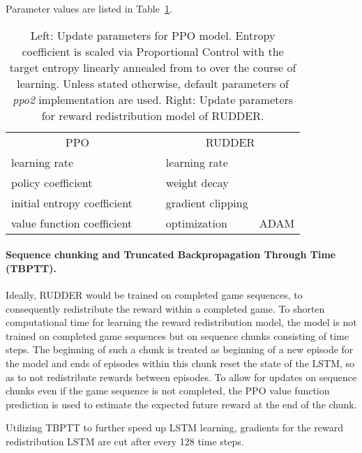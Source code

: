 \documentclass{article}
\begin{document}
\begin{appendices}
Parameter values are listed in Table~\ref{tab:atari_params}.


\begin{table}[htp]
\begin{center}
\begin{tabular}{lrclr}
\toprule
\multicolumn{2}{c}{PPO} & & \multicolumn{2}{c}{RUDDER}\\
learning rate &  & & learning rate &  \\
policy coefficient &  & &  weight decay  &  \\
initial entropy coefficient &  & & gradient clipping  &  \\
value function coefficient &  & & optimization & ADAM \\
\bottomrule
\end{tabular}
\end{center}
\caption{Left: Update parameters for PPO model.
Entropy coefficient is scaled via Proportional Control 
with the target entropy linearly annealed from  to  over the course of learning.
Unless stated otherwise,
default parameters of {\em ppo2} implementation \cite{Dhariwal:17} are used.
Right: Update parameters for reward redistribution model of RUDDER.
\label{tab:atari_params}}\end{table}


\paragraph{Sequence chunking and Truncated Backpropagation Through Time (TBPTT).}
Ideally, RUDDER would be trained on completed game sequences,
to consequently redistribute the reward within a completed game.
To shorten computational time for learning the reward redistribution model,
the model is not trained on completed game sequences
but on sequence chunks consisting of  time steps.
The beginning of such a chunk is treated as beginning of a new episode for the model
and ends of episodes within this chunk reset the state of the LSTM,
so as to not redistribute rewards between episodes.
To allow for updates on sequence chunks even if the game sequence is not completed,
the PPO value function prediction is used to estimate the expected future reward at the end of the chunk.

Utilizing TBPTT to further speed up LSTM learning,
gradients for the reward redistribution LSTM are cut after every 128 time steps.





\end{appendices}
\end{document}
